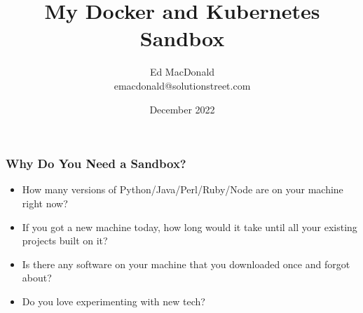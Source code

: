 
\usepackage[utf8]{inputenc}
\usepackage{minted}
\usepackage{listings}
\usepackage{graphicx}
\usepackage{xcolor}
\usepackage{adjustbox}


\hypersetup{colorlinks,linkcolor=,urlcolor=links}

\setlength{\columnseprule}{0.4pt}


\title[Sandbox]{My Docker and Kubernetes Sandbox}
\author[Ed MacDonald]{Ed MacDonald\\emacdonald@solutionstreet.com}
\date{December 2022}




    \frame{\titlepage}

    \begin{frame}
      \frametitle{Why Do You Need a Sandbox?}
      \begin{itemize}
      \pause
      \item How many versions of Python/Java/Perl/Ruby/Node are on your machine right now?\pause
      \item If you got a new machine today, how long would it take until all your existing projects built on it?\pause
      \item Is there any software on your machine that you downloaded once and forgot about?\pause
      \item Do you love experimenting with new tech?
      \end{itemize}
    \end{frame}

